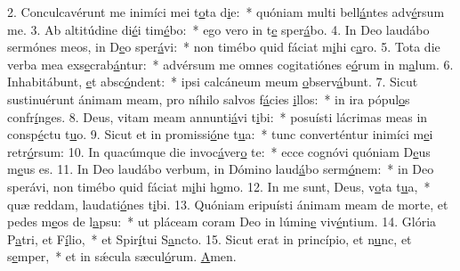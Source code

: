 2. Conculcavérunt me inimíci mei t\uline{o}ta d\uline{i}e:~* quóniam multi bell\uline{á}ntes adv\uline{é}rsum me.
3. Ab altitúdine di\uline{é}i tim\uline{é}bo:~* ego vero in t\uline{e} sper\uline{á}bo.
4. In Deo laudábo sermónes meos, in D\uline{e}o sper\uline{á}vi:~* non timébo quid fáciat m\uline{i}hi c\uline{a}ro.
5. Tota die verba mea exs\uline{e}crab\uline{á}ntur:~* advérsum me omnes cogitatiónes e\uline{ó}rum in m\uline{a}lum.
6. Inhabitábunt, \uline{e}t absc\uline{ó}ndent:~* ipsi calcáneum meum \uline{o}bserv\uline{á}bunt.
7. Sicut sustinuérunt ánimam meam, pro níhilo salvos f\uline{á}cies \uline{i}llos:~* in ira pópul\uline{o}s confr\uline{í}nges.
8. Deus, vitam meam annunti\uline{á}vi t\uline{i}bi:~* posuísti lácrimas meas in consp\uline{é}ctu t\uline{u}o.
9. Sicut et in promissi\uline{ó}ne t\uline{u}a:~* tunc converténtur inimíci m\uline{e}i retr\uline{ó}rsum:
10. In quacúmque die invoc\uline{á}ver\uline{o} te:~* ecce cognóvi quóniam D\uline{e}us m\uline{e}us es.
11. In Deo laudábo verbum, in Dómino laud\uline{á}bo serm\uline{ó}nem:~* in Deo sperávi, non timébo quid fáciat m\uline{i}hi h\uline{o}mo.
12. In me sunt, Deus, v\uline{o}ta t\uline{u}a,~* quæ reddam, laudati\uline{ó}nes t\uline{i}bi.
13. Quóniam eripuísti ánimam meam de morte, et pedes m\uline{e}os de l\uline{a}psu:~* ut pláceam coram Deo in lúmin\uline{e} viv\uline{é}ntium.
14. Glória P\uline{a}tri, et F\uline{í}lio,~* et Spir\uline{í}tui S\uline{a}ncto.
15. Sicut erat in princípio, et n\uline{u}nc, et s\uline{e}mper,~* et in sǽcula sæcul\uline{ó}rum. \uline{A}men.
